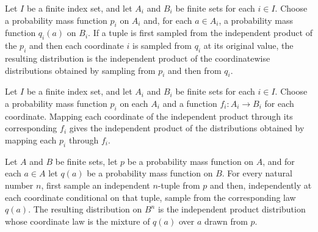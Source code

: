 \begin{theorem}
\label{FABL.independentProductPMF_bind_coordinates}
\leanok
{}
Let $I$ be a finite index set, and let $A_i$ and $B_i$ be finite sets for each $i\in I$.
Choose a probability mass function $p_i$ on $A_i$ and, for each $a\in A_i$, a
probability mass function $q_i(a)$ on $B_i$. If a tuple is first sampled from the
independent product of the $p_i$ and then each coordinate $i$ is sampled from $q_i$ at
its original value, the resulting distribution is the independent product of the
coordinatewise distributions obtained by sampling from $p_i$ and then from $q_i$.
\end{theorem}

\begin{theorem}
\label{FABL.independentProductPMF_map_coordinates}
\leanok
{}
Let $I$ be a finite index set, and let $A_i$ and $B_i$ be finite sets for each $i\in I$.
Choose a probability mass function $p_i$ on each $A_i$ and a function $f_i:A_i\to B_i$
for each coordinate. Mapping each coordinate of the independent product through its
corresponding $f_i$ gives the independent product of the distributions obtained by
mapping each $p_i$ through $f_i$.
\end{theorem}

\begin{theorem}
\label{FABL.productProbabilityPMF_bind_coordinates}
\leanok
{}
Let $A$ and $B$ be finite sets, let $p$ be a probability mass function on $A$, and for
each $a\in A$ let $q(a)$ be a probability mass function on $B$. For every natural number
$n$, first sample an independent $n$-tuple from $p$ and then, independently at each
coordinate conditional on that tuple, sample from the corresponding law $q(a)$. The
resulting distribution on $B^n$ is the independent product distribution whose coordinate
law is the mixture of $q(a)$ over $a$ drawn from $p$.
\end{theorem}

